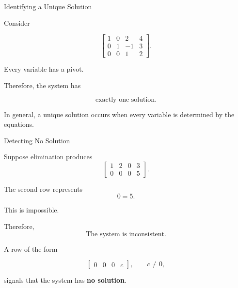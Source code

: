 
\begin{frame}{Identifying a Unique Solution}

Consider

\[
\left[
\begin{array}{ccc|c}
1&0&2&4\\
0&1&-1&3\\
0&0&1&2
\end{array}
\right].
\]

Every variable has a pivot.

\vspace{0.4cm}

Therefore, the system has

\[
\boxed{
\text{exactly one solution}.
}
\]

In general, a unique solution occurs when every variable
is determined by the equations.

\end{frame}



\begin{frame}{Detecting No Solution}

Suppose elimination produces
\vspace{-0.1cm}
\[
\left[
\begin{array}{ccc|c}
1&2&0&3\\
0&0&0&5
\end{array}
\right].
\]

The second row represents
\vspace{-0.1cm}
\[
0=5.
\]

This is impossible.

Therefore,
\vspace{-0.1cm}
\[
\boxed{
\text{The system is inconsistent.}
}
\]

A row of the form

\[
\left[
\begin{array}{ccc|c}
0&0&0&c
\end{array}
\right],
\qquad c\neq0,
\]

signals that the system has \textbf{no solution}.

\end{frame}



